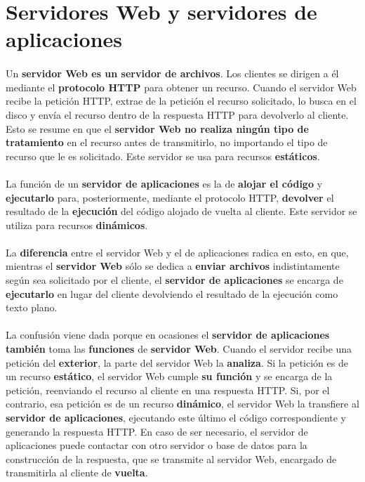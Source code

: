 \documentclass{article}
\begin{document}
	\section{Servidores Web y servidores de aplicaciones}
	
	\paragraph{}Un \textbf{servidor Web es un servidor de archivos}. Los clientes se dirigen a él mediante el \textbf{protocolo HTTP} para obtener un recurso. Cuando el servidor Web recibe la petición HTTP, extrae de la petición el recurso solicitado, lo busca en el disco y envía el recurso dentro de la respuesta HTTP para devolverlo al cliente. Esto se resume en que el \textbf{servidor Web no realiza ningún tipo de tratamiento} en el recurso antes de transmitirlo, no importando el tipo de recurso que le es solicitado.
	Este servidor se usa para recursos \textbf{estáticos}.
	
	\paragraph{}La función de un \textbf{servidor de aplicaciones} es la de \textbf{alojar el código} y \textbf{ejecutarlo} para, posteriormente, mediante el protocolo HTTP, \textbf{devolver} el resultado de la \textbf{ejecución} del código alojado de vuelta al cliente. Este servidor se utiliza para recursos \textbf{dinámicos}.
	
	\paragraph{}La \textbf{diferencia} entre el servidor Web y el de aplicaciones radica en esto, en que, mientras el \textbf{servidor Web} sólo se dedica a \textbf{enviar archivos} indistintamente según sea solicitado por el cliente, el \textbf{servidor de aplicaciones} se encarga de \textbf{ejecutarlo} en lugar del cliente devolviendo el resultado de la ejecución como texto plano.
	
	\paragraph{}La confusión viene dada porque en ocasiones el \textbf{servidor de aplicaciones} \textbf{también} toma las \textbf{funciones} de \textbf{servidor Web}. Cuando el servidor recibe una petición del \textbf{exterior}, la parte del servidor Web la \textbf{analiza}. Si la petición es de un recurso \textbf{estático}, el servidor Web cumple \textbf{su función} y se encarga de la petición, reenviando el recurso al cliente en una respuesta HTTP. Si, por el contrario, esa petición es de un recurso \textbf{dinámico}, el servidor Web la transfiere al \textbf{servidor de aplicaciones}, ejecutando este último el código correspondiente y generando la respuesta HTTP. En caso de ser necesario, el servidor de aplicaciones puede contactar con otro servidor o base de datos para la construcción de la respuesta, que se transmite al servidor Web, encargado de transmitirla al cliente de \textbf{vuelta}.
	
\end{document}
